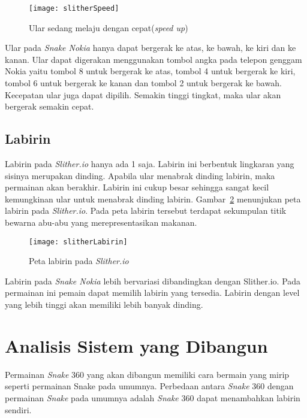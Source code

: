 \begin{figure}[H]
	\centering  
	\texttt{[image: slitherSpeed]}  
	\caption[Ular sedang melaju dengan cepat(\textit{speed up})]{Ular sedang melaju dengan cepat(\textit{speed up})}
	\label{fig:slitherSpeed} 
\end{figure}

Ular pada \textit{Snake Nokia} hanya dapat bergerak ke atas, ke bawah, ke kiri dan ke kanan. Ular dapat digerakan menggunakan tombol angka pada telepon genggam Nokia yaitu tombol 8 untuk bergerak ke atas, tombol 4 untuk bergerak ke kiri, tombol 6 untuk bergerak ke kanan dan tombol 2 untuk bergerak ke bawah. Kecepatan ular juga dapat dipilih. Semakin tinggi tingkat, maka ular akan bergerak semakin cepat.

\subsection{Labirin}
Labirin pada \textit{Slither.io} hanya ada 1 saja. Labirin ini berbentuk lingkaran yang sisinya merupakan dinding. Apabila ular menabrak dinding labirin, maka permainan akan berakhir. Labirin ini cukup besar sehingga sangat kecil kemungkinan ular untuk menabrak dinding labirin. Gambar~\ref{fig:slitherLabirin} menunjukan peta labirin pada \textit{Slither.io}. Pada peta labirin tersebut terdapat sekumpulan titik bewarna abu-abu yang merepresentasikan makanan.

\begin{figure}[H]
	\centering  
	\texttt{[image: slitherLabirin]}  
	\caption[Peta labirin pada \textit{Slither.io}]{Peta labirin pada \textit{Slither.io}}
	\label{fig:slitherLabirin} 
\end{figure}

Labirin pada \textit{Snake Nokia} lebih bervariasi dibandingkan dengan Slither.io. Pada permainan ini pemain dapat memilih labirin yang tersedia. Labirin dengan level yang lebih tinggi akan memiliki lebih banyak dinding. 

\section{Analisis Sistem yang Dibangun}
Permainan \textit{Snake} 360 yang akan dibangun memiliki cara bermain yang mirip seperti permainan Snake pada umumnya. Perbedaan antara \textit{Snake} 360 dengan permainan \textit{Snake} pada umumnya adalah \textit{Snake} 360 dapat menambahkan labirin sendiri. 

